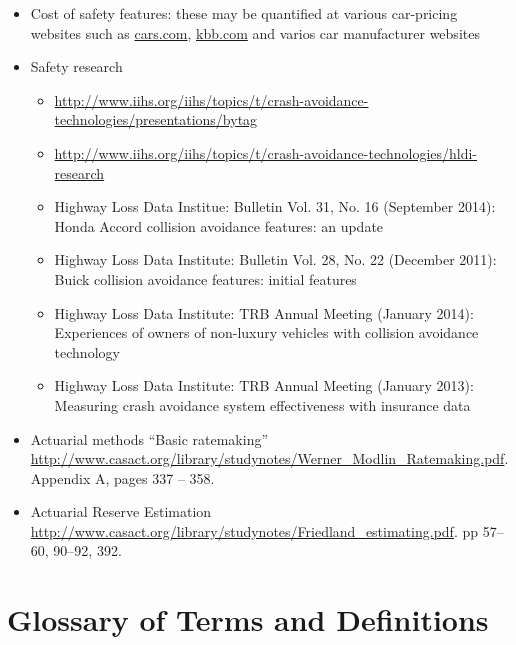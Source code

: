 \documentclass[12pt]{article}
\begin{document}
\begin{itemize}
\item Cost of safety features: these may be quantified at various car-pricing websites such as \url{cars.com}, \url{kbb.com} and varios car manufacturer websites
\item Safety research
\begin{itemize}
\item \url{http://www.iihs.org/iihs/topics/t/crash-avoidance-technologies/presentations/bytag} 
\item \url{http://www.iihs.org/iihs/topics/t/crash-avoidance-technologies/hldi-research}
\item Highway Loss Data Institue: Bulletin Vol. 31, No. 16 (September 2014): Honda Accord collision avoidance features: an update
\item Highway Loss Data Institute: Bulletin Vol. 28, No. 22 (December 2011): Buick collision avoidance features: initial features 
\item Highway Loss Data Institute: TRB Annual Meeting (January 2014): Experiences of owners of non-luxury vehicles with collision avoidance technology
\item Highway Loss Data Institute: TRB Annual Meeting (January 2013): Measuring crash avoidance system effectiveness with insurance data
\end{itemize}
\item Actuarial methods ``Basic ratemaking'' \url{http://www.casact.org/library/studynotes/Werner_Modlin_Ratemaking.pdf}. Appendix A, pages 337 -- 358.
\item Actuarial Reserve Estimation \url{http://www.casact.org/library/studynotes/Friedland_estimating.pdf}. pp 57--60, 90--92, 392.
\end{itemize}

\section{Glossary of Terms and Definitions}
\end{document}
